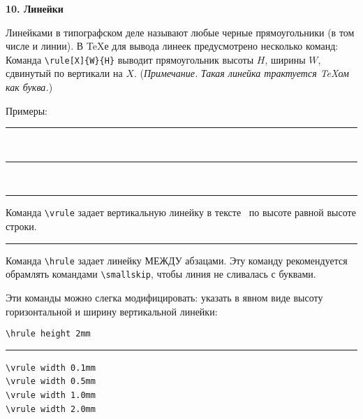 \documentclass{article}
\begin{document}
\bigskip


\textbf{10. Линейки}

Линейками в типографском деле называют любые черные прямоугольники (в том числе и линии). В \TeX е для вывода линеек предусмотрено несколько команд:\\
Команда \verb"\rule[X]{W}{H}" выводит прямоугольник высоты $H$, ширины $W$, сдвинутый по вертикали на $X$. (\emph{Примечание.} \textsl{Такая линейка трактуется \TeX ом как буква.})

Примеры: \rule{1em}{1.5ex} ~ \rule{2mm}{10pt} ~ \rule[-5pt]{2em}{.5ex}

\bigskip

Команда \verb"\vrule" задает вертикальную линейку в тексте \vrule ~по высоте равной высоте строки.

\smallskip

\hrule

\smallskip

Команда \verb"\hrule" задает линейку МЕЖДУ абзацами. Эту команду рекомендуется обрамлять командами \verb"\smallskip", чтобы линия не сливалась с буквами.

\bigskip

Эти команды можно слегка модифицировать: указать в явном виде высоту горизонтальной и ширину вертикальной линейки:
\begin{center}

\verb"\hrule height 2mm"

\smallskip

\hrule height 2mm

\end{center}


\begin{center}

\verb"\vrule width 0.1mm" \ \vrule width 0.1mm \\
\verb"\vrule width 0.5mm" \ \vrule width 0.5mm \\
\verb"\vrule width 1.0mm" \ \vrule width 1.0mm \\
\verb"\vrule width 2.0mm" \ \vrule width 2.0mm \\

\end{center}
\end{document}
